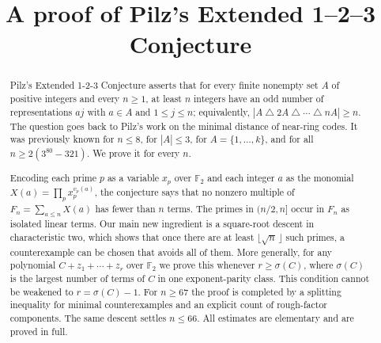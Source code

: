 \documentclass[11pt]{amsart}
\numberwithin{equation}{section}
\theoremstyle{definition}
\theoremstyle{remark}
\newcommand{\Ft}{\mathbb{F}_2}
\begin{document}
\title{A proof of Pilz's Extended 1--2--3 Conjecture}

\author{}

\date{}

\begin{abstract}
Pilz's Extended 1-2-3 Conjecture asserts that for every finite nonempty set $A$ of positive integers and every $n\ge1$, at least $n$ integers have an odd number of representations $aj$ with $a\in A$ and $1\le j\le n$; equivalently, $|A\mathbin{\triangle}2A\mathbin{\triangle}\cdots\mathbin{\triangle}nA|\ge n$. The question goes back to Pilz's work on the minimal distance of near-ring codes. It was previously known for $n\le8$, for $|A|\le3$, for $A=\{1,\dots,k\}$, and for all $n\ge2(3^{80}-321)$. We prove it for every $n$.

Encoding each prime $p$ as a variable $x_p$ over $\Ft$ and each integer $a$ as the monomial $X(a)=\prod_px_p^{v_p(a)}$, the conjecture says that no nonzero multiple of $F_n=\sum_{a\le n}X(a)$ has fewer than $n$ terms. The primes in $(n/2,n]$ occur in $F_n$ as isolated linear terms. Our main new ingredient is a square-root descent in characteristic two, which shows that once there are at least $\lfloor\sqrt n\,\rfloor$ such primes, a counterexample can be chosen that avoids all of them. More generally, for any polynomial $C+z_1+\cdots+z_r$ over $\Ft$ we prove this whenever $r\ge\sigma(C)$, where $\sigma(C)$ is the largest number of terms of $C$ in one exponent-parity class. This condition cannot be weakened to $r=\sigma(C)-1$. For $n\ge67$ the proof is completed by a splitting inequality for minimal counterexamples and an explicit count of rough-factor components. The same descent settles $n\le66$. All estimates are elementary and are proved in full.
\end{abstract}

\maketitle
\setcounter{tocdepth}{1}
\tableofcontents











\appendix

\end{document}
